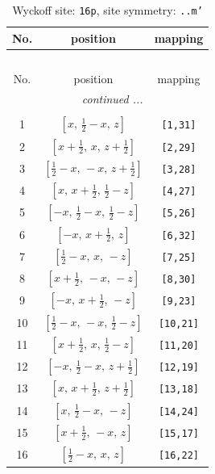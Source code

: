 \documentclass[fleqn,8pt]{jsarticle}
\begin{document}
\renewcommand{\arraystretch}{1.2}
\begin{longtable}{ccc}
\caption{Wyckoff site: {\tt 16p}, site symmetry: {\tt ..m'}}
 \\
 \hline \hline
No. & position & mapping \\ \hline \endfirsthead

\multicolumn{2}{l}{\tablename\ \thetable{}} \\
 \hline \hline
No. & position & mapping \\ \hline \endhead

 \hline \hline
\multicolumn{2}{r}{\footnotesize\it continued ...} \\ \endfoot

 \hline \hline
\multicolumn{2}{r}{} \\ \endlastfoot

1 & $\left[ x,\, \frac{1}{2} - x,\, z \right]$ & {\tt [1,31]} \\ \hline
2 & $\left[ x + \frac{1}{2},\, x,\, z + \frac{1}{2} \right]$ & {\tt [2,29]} \\ \hline
3 & $\left[ \frac{1}{2} - x,\, - x,\, z + \frac{1}{2} \right]$ & {\tt [3,28]} \\ \hline
4 & $\left[ x,\, x + \frac{1}{2},\, \frac{1}{2} - z \right]$ & {\tt [4,27]} \\ \hline
5 & $\left[ - x,\, \frac{1}{2} - x,\, \frac{1}{2} - z \right]$ & {\tt [5,26]} \\ \hline
6 & $\left[ - x,\, x + \frac{1}{2},\, z \right]$ & {\tt [6,32]} \\ \hline
7 & $\left[ \frac{1}{2} - x,\, x,\, - z \right]$ & {\tt [7,25]} \\ \hline
8 & $\left[ x + \frac{1}{2},\, - x,\, - z \right]$ & {\tt [8,30]} \\ \hline
9 & $\left[ - x,\, x + \frac{1}{2},\, - z \right]$ & {\tt [9,23]} \\ \hline
10 & $\left[ \frac{1}{2} - x,\, - x,\, \frac{1}{2} - z \right]$ & {\tt [10,21]} \\ \hline
11 & $\left[ x + \frac{1}{2},\, x,\, \frac{1}{2} - z \right]$ & {\tt [11,20]} \\ \hline
12 & $\left[ - x,\, \frac{1}{2} - x,\, z + \frac{1}{2} \right]$ & {\tt [12,19]} \\ \hline
13 & $\left[ x,\, x + \frac{1}{2},\, z + \frac{1}{2} \right]$ & {\tt [13,18]} \\ \hline
14 & $\left[ x,\, \frac{1}{2} - x,\, - z \right]$ & {\tt [14,24]} \\ \hline
15 & $\left[ x + \frac{1}{2},\, - x,\, z \right]$ & {\tt [15,17]} \\ \hline
16 & $\left[ \frac{1}{2} - x,\, x,\, z \right]$ & {\tt [16,22]} \\
\end{longtable}
\end{document}
